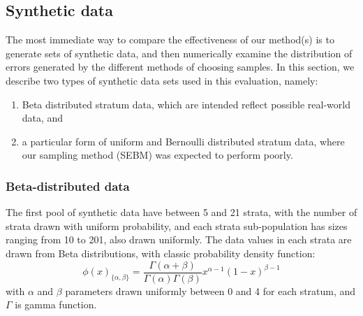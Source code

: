 \subsection{Synthetic data}
\label{ssec:SyntheticDists}
The most immediate way to compare the effectiveness of our method(s) is to generate sets of synthetic data, and then numerically examine the distribution of errors generated by the different methods of choosing samples.
In this section, we describe two types of synthetic data sets used in this evaluation, namely:
\begin{enumerate}
\item Beta distributed stratum data, which are intended reflect possible real-world data, and 
\item a particular form of uniform and Bernoulli distributed stratum data, where our sampling method (SEBM) was expected to perform poorly.
\end{enumerate}

\subsubsection{Beta-distributed data}\label{sec:beta_distributed_data}
The first pool of synthetic data %
have between 5 and 21 strata, with the number of strata drawn with uniform probability, 
and each strata sub-population has sizes ranging from 10 to 201, also drawn uniformly.
The data values in each strata are drawn from Beta distributions, with classic probability density function:
$$\phi(x)_{\{\alpha,\beta\}}
=\frac{\Gamma(\alpha+\beta)}{\Gamma(\alpha)\Gamma(\beta)}     
    x^{\alpha-1}(1-x)^{\beta-1} $$
with $\alpha$ and $\beta$ parameters drawn uniformly between 0 and 4 for each stratum, and $\Gamma$ is gamma function.








